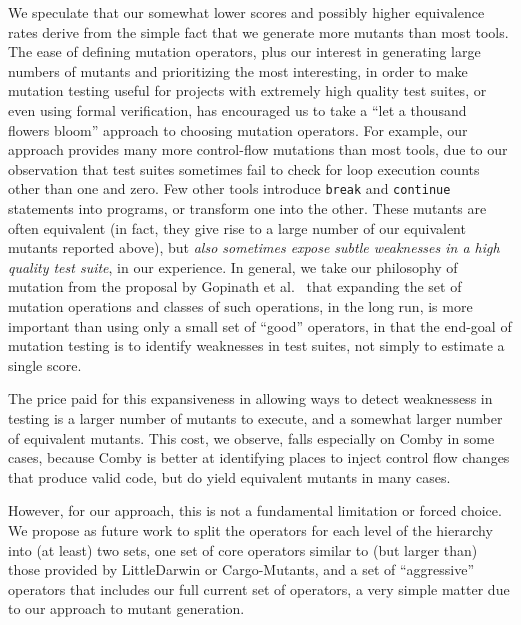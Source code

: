 \documentclass[sigconf,review, anonymous]{acmart}
\begin{document}
We speculate that our somewhat lower scores and possibly higher
equivalence rates derive from the simple fact that we generate more
mutants than most tools.  The ease of defining mutation operators,
plus our interest in generating large numbers of mutants and
prioritizing the most interesting, in order to make mutation testing useful for
projects with extremely high quality test suites, or even using formal
verification, has encouraged us to take a ``let a thousand flowers bloom''
approach to choosing mutation operators.  For example, our approach
provides many more control-flow mutations than most tools, due to our
observation that test suites sometimes fail to check for loop
execution counts other than one and zero.  Few other tools introduce
{\tt break} and {\tt continue} statements into programs, or transform
one into the other.  These mutants are often equivalent (in fact, they
give rise to a large number of our equivalent mutants reported above), but \emph{also
sometimes expose subtle weaknesses in a high quality test suite}, in our
experience.  In general, we take our philosophy of mutation from the
proposal by Gopinath et al.~\cite{Limits,gopinath2017mutation} that
expanding the set of mutation operations and classes of such
operations, in the long run, is more important than using only a small
set of ``good'' operators, in that the end-goal of mutation testing is
to identify weaknesses in test suites, not simply to estimate a single
score.  

The price paid for this
expansiveness in allowing ways to detect weaknessess in testing is a
larger number of mutants to execute, and a somewhat larger number of
equivalent mutants.  This cost, we observe, falls especially on Comby in some
cases, because Comby is better at identifying places to inject
control flow changes that produce valid code, but do yield equivalent mutants in
many cases.

However, for our approach, this is not a
fundamental limitation or forced choice.  We propose as future work to
split the operators for each level of the hierarchy into (at least) two sets, one
set of core operators similar to (but larger than) those provided by
LittleDarwin or Cargo-Mutants, and a set of ``aggressive'' operators
that includes our full current set of operators, a very simple matter due to
our approach to mutant generation.
\end{document}
